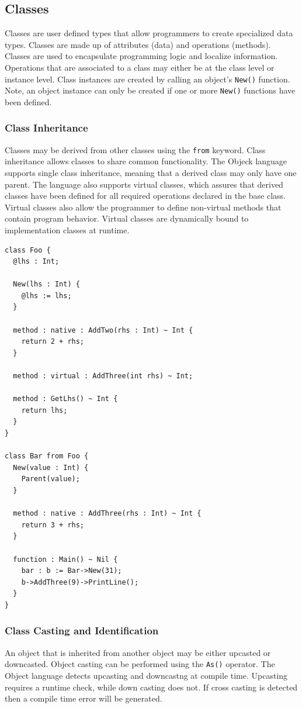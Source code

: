 \documentclass[12pt]{article}
\begin{document}
\subsection{Classes}
Classes are user defined types that allow programmers to create
specialized data types.  Classes are made up of attributes (data) and
operations (methods).  Classes are used to encapsulate programming
logic and localize information.  Operations that are associated to a
class may either be at the class level or instance level.  Class
instances are created by calling an object's \texttt{New()} function.
Note, an object instance can only be created if one or more
\texttt{New()} functions have been defined.

\subsubsection{Class Inheritance}
Classes may be derived from other classes using the \texttt{from}
keyword.  Class inheritance allows classes to share common
functionality.  The Objeck language supports single class inheritance,
meaning that a derived class may only have one parent.  The language
also supports virtual classes, which assures that derived classes have
been defined for all required operations declared in the base class.
Virtual classes also allow the programmer to define non-virtual
methods that contain program behavior.  Virtual classes are
dynamically bound to implementation classes at runtime.
\begin{verbatim}
class Foo {
  @lhs : Int;

  New(lhs : Int) {
    @lhs := lhs;
  }

  method : native : AddTwo(rhs : Int) ~ Int {
    return 2 + rhs;
  }

  method : virtual : AddThree(int rhs) ~ Int;

  method : GetLhs() ~ Int {
    return lhs;
  }
}

class Bar from Foo {
  New(value : Int) {
    Parent(value);
  }

  method : native : AddThree(rhs : Int) ~ Int {
    return 3 + rhs;
  }

  function : Main() ~ Nil {
    bar : b := Bar->New(31);
    b->AddThree(9)->PrintLine();
  }
}
\end{verbatim}

\subsubsection{Class Casting and Identification}
An object that is inherited from another object may be either upcasted
or downcasted.  Object casting can be performed using the
\texttt{As()} operator.  The Object language detects upcasting and
downcastng at compile time. Upcasting requires a runtime check, while
down casting does not. If cross casting is detected then a compile
time error will be generated.
\end{document}
